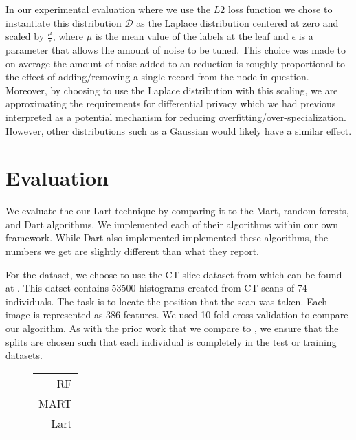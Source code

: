 \documentclass{article} %
\begin{document}
In our experimental evaluation where we use the $L2$ loss function we chose to instantiate this distribution $\mathcal{D}$ as the Laplace distribution centered at zero and scaled by $\frac{\mu}{\epsilon}$, where $\mu$ is the mean value of the labels at the leaf and $\epsilon$ is a parameter that allows the amount of noise to be tuned. This choice was made to on average the amount of noise added to an reduction is roughly proportional to the effect of adding/removing a single record from the node in question. Moreover, by choosing to use the Laplace distribution with this scaling, we are approximating the requirements for differential privacy which we had previous interpreted as a potential mechanism for reducing overfitting/over-specialization. However, other distributions such as a Gaussian would likely have a similar effect. 


\section{Evaluation}

We evaluate the our Lart technique by comparing it to the Mart, random forests, and Dart\cite{dart} algorithms. We implemented each of their algorithms within our own framework. While Dart\cite{dart} also implemented implemented these algorithms, the numbers we get are slightly different than what they report. 

For the dataset, we choose to use the CT slice dataset from \cite{graf20112d} which can be found at \cite{uci_ctSlice}. This datset contains 53500 histograms created from CT scans of 74 individuals. The task is to locate the position that the scan was taken. Each image is represented as 386 features. We used 10-fold cross validation to compare our algorithm. As with the prior work that we compare to \cite{dart}, we ensure that the splits are chosen such that each individual is completely in the test or training datasets.


\begin{figure}	\centering
	\begin{tabular}{|r|}
 \hline
 
 \hline
               RF \\
               MART \\
               Lart \\\hline
	\end{tabular} 	
	\caption{ }
\end{figure}
\end{document}
